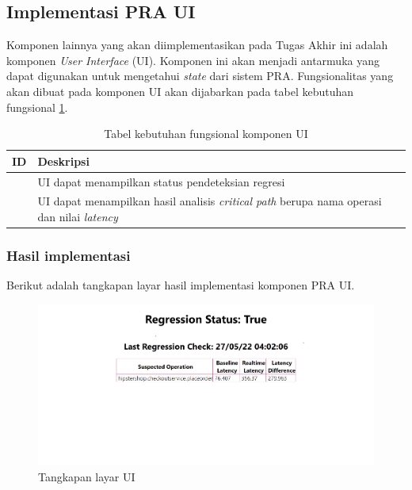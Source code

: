 \subsection{Implementasi PRA UI}
Komponen lainnya yang akan diimplementasikan pada Tugas Akhir ini adalah komponen \textit{User Interface} (UI). Komponen ini akan menjadi antarmuka yang dapat digunakan untuk mengetahui \textit{state} dari sistem PRA. Fungsionalitas yang akan dibuat pada komponen UI akan dijabarkan pada tabel kebutuhan  fungsional \ref{ui-functional}.
\begin{small}
	\begin{longtable}{ | p{3cm} | p{9cm} | }
		\caption{Tabel kebutuhan fungsional komponen UI}
		\label{ui-functional}                                                           
		\\ \hline
		\centering\bfseries{ID} & \centering\bfseries{Deskripsi} \tabularnewline \hline
		\endfirsthead
		\centering{UI-1} & UI dapat menampilkan status pendeteksian regresi  \\ \hline
		\centering{UI-2} & UI dapat menampilkan hasil analisis \textit{critical path} berupa nama operasi dan nilai \textit{latency} \\ \hline

	\end{longtable}
\end{small}

\subsubsection{Hasil implementasi}
Berikut adalah tangkapan layar hasil implementasi komponen PRA UI.

\begin{figure}[!htb]
	\centering
	\includegraphics[width=1\textwidth]{resources/ch4/ui.png}
	\caption{Tangkapan layar UI}
	\label{ui}
\end{figure}

